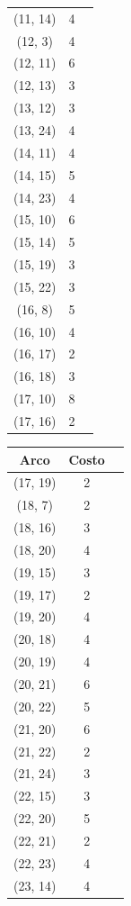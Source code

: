 \documentclass{article}
\begin{document}
\begin{table}[h!]
\begin{tabular}{ccc}
        (11, 14) & 4 \\
        (12, 3) & 4 \\
        (12, 11) & 6 \\
        (12, 13) & 3 \\
        (13, 12) & 3 \\
        (13, 24) & 4 \\
        (14, 11) & 4 \\
        (14, 15) & 5 \\
        (14, 23) & 4 \\
        (15, 10) & 6 \\
        (15, 14) & 5 \\
        (15, 19) & 3 \\
        (15, 22) & 3 \\
        (16, 8) & 5 \\
        (16, 10) & 4 \\
        (16, 17) & 2 \\
        (16, 18) & 3 \\
        (17, 10) & 8 \\
        (17, 16) & 2 \\
     \bottomrule
    \end{tabular}
    \begin{tabular}{ccc}
      \toprule
        Arco & Costo \\
      \midrule
        (17, 19) & 2 \\
        (18, 7) & 2 \\
        (18, 16) & 3 \\
        (18, 20) & 4 \\
        (19, 15) & 3 \\
        (19, 17) & 2 \\
        (19, 20) & 4 \\
        (20, 18) & 4 \\
        (20, 19) & 4 \\
        (20, 21) & 6 \\
        (20, 22) & 5 \\
        (21, 20) & 6 \\
        (21, 22) & 2 \\
        (21, 24) & 3 \\
        (22, 15) & 3 \\
        (22, 20) & 5 \\
        (22, 21) & 2 \\
        (22, 23) & 4 \\
        (23, 14) & 4 \\

\end{tabular}
\end{table}
\end{document}
